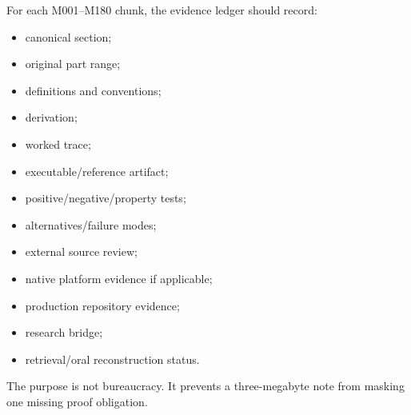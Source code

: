 For each M001--M180 chunk, the evidence ledger should record:

\begin{itemize}
\tightlist
\item
  canonical section;
\item
  original part range;
\item
  definitions and conventions;
\item
  derivation;
\item
  worked trace;
\item
  executable/reference artifact;
\item
  positive/negative/property tests;
\item
  alternatives/failure modes;
\item
  external source review;
\item
  native platform evidence if applicable;
\item
  production repository evidence;
\item
  research bridge;
\item
  retrieval/oral reconstruction status.
\end{itemize}

The purpose is not bureaucracy. It prevents a three-megabyte note from masking one missing proof obligation.
